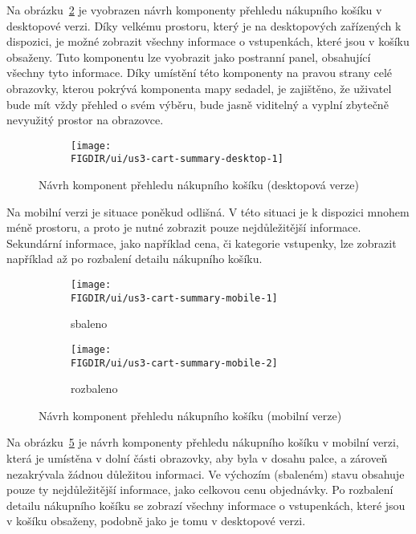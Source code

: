 Na obrázku~\ref{fig:us3-cart-summary-desktop} je vyobrazen návrh komponenty přehledu nákupního košíku v desktopové verzi.
Díky velkému prostoru, který je na desktopových zařízených k dispozici, je možné zobrazit všechny informace o vstupenkách, které jsou v košíku obsaženy.
Tuto komponentu lze vyobrazit jako postranní panel, obsahující všechny tyto informace.
Díky umístění této komponenty na pravou strany celé obrazovky, kterou pokrývá komponenta mapy sedadel, je zajištěno, že uživatel bude mít vždy přehled o svém výběru, bude jasně viditelný a vyplní zbytečně nevyužitý prostor na obrazovce.

\begin{figure}[H]
    \centering
    \begin{subfigure}{\textwidth}
        \texttt{[image: \\FIGDIR/ui/us3-cart-summary-desktop-1]}
        \label{fig:uus3-cart-summary-desktop-1}
    \end{subfigure}
    \caption{Návrh komponent přehledu nákupního košíku (desktopová verze)}
    \label{fig:us3-cart-summary-desktop}
\end{figure}

Na mobilní verzi je situace poněkud odlišná.
V této situaci je k dispozici mnohem méně prostoru, a proto je nutné zobrazit pouze nejdůležitější informace.
Sekundární informace, jako například cena, či kategorie vstupenky, lze zobrazit například až po rozbalení detailu nákupního košíku.

\begin{figure}[H]
    \centering
    \begin{subfigure}{0.4\textwidth}
        \texttt{[image: \\FIGDIR/ui/us3-cart-summary-mobile-1]}
        \caption{sbaleno}
        \label{fig:us3-cart-summary-mobile-1}
    \end{subfigure}
    \hfill
    \begin{subfigure}{0.4\textwidth}
        \texttt{[image: \\FIGDIR/ui/us3-cart-summary-mobile-2]}
        \caption{rozbaleno}
        \label{fig:us3-cart-summary-mobile-2}
    \end{subfigure}

    \caption{Návrh komponent přehledu nákupního košíku (mobilní verze)}
    \label{fig:us3-cart-summary-mobile}
\end{figure}

Na obrázku~\ref{fig:us3-cart-summary-mobile} je návrh komponenty přehledu nákupního košíku v mobilní verzi, která je umístěna v dolní části obrazovky, aby byla v dosahu palce, a zároveň nezakrývala žádnou důležitou informaci.
Ve výchozím (sbaleném) stavu obsahuje pouze ty nejdůležitější informace, jako celkovou cenu objednávky.
Po rozbalení detailu nákupního košíku se zobrazí všechny informace o vstupenkách, které jsou v košíku obsaženy, podobně jako je tomu v desktopové verzi.

